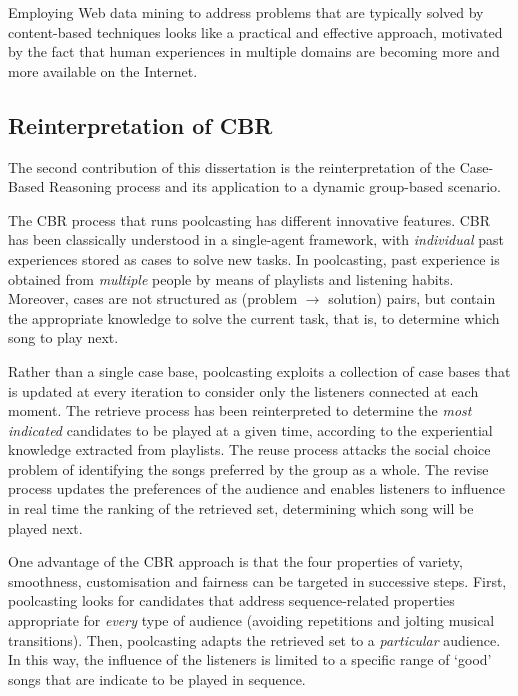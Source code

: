 Employing Web data mining to address problems that are typically solved by content-based techniques looks like a practical and effective approach, motivated by the fact that human experiences in multiple domains are becoming more and more available on the Internet.

\subsection{Reinterpretation of CBR} %
\label{sec:reinterpretation_of_cbr}

The second contribution of this dissertation is the reinterpretation of the Case-Based Reasoning process and its application to a dynamic group-based scenario.

The CBR process that runs poolcasting has different innovative features.
CBR has been classically understood in a single-agent framework, with \emph{individual} past experiences stored as cases to solve new tasks.
In poolcasting, past experience is obtained from \emph{multiple} people by means of playlists and listening habits.
Moreover, cases are not structured as (problem $\rightarrow$ solution) pairs, but contain the appropriate knowledge to solve the current task, that is, to determine which song to play next.

Rather than a single case base, poolcasting exploits a collection of case bases that is updated at every iteration to consider only the listeners connected at each moment.
%
The retrieve process has been reinterpreted to determine the \emph{most indicated} candidates to be played at a given time, according to the experiential knowledge extracted from playlists.
%
The reuse process attacks the social choice problem of identifying the songs preferred by the group as a whole.
%
The revise process updates the preferences of the audience and enables listeners to influence in real time the ranking of the retrieved set, determining which song will be played next.

One advantage of the CBR approach is that the four properties of variety, smoothness, customisation and fairness can be targeted in successive steps.
First, poolcasting looks for candidates that address sequence-related properties appropriate for \emph{every} type of audience (avoiding repetitions and jolting musical transitions).
Then, poolcasting adapts the retrieved set to a \emph{particular} audience.
In this way, the influence of the listeners is limited to a specific range of `good' songs that are indicate to be played in sequence.

